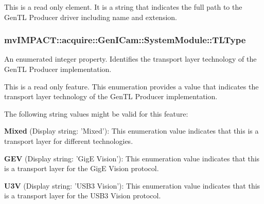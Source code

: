 This is a read only element. It is a string that indicates the full path to the Gen\+T\+L Producer driver including name and extension. \hypertarget{classmv_i_m_p_a_c_t_1_1acquire_1_1_gen_i_cam_1_1_system_module_a483183eb91826654275c0861dce3e1cd}{
\subsubsection[{T\+L\+Type}]{ mv\+I\+M\+P\+A\+C\+T\+::acquire\+::\+Gen\+I\+Cam\+::\+System\+Module\+::\+T\+L\+Type}}\label{classmv_i_m_p_a_c_t_1_1acquire_1_1_gen_i_cam_1_1_system_module_a483183eb91826654275c0861dce3e1cd}


An enumerated integer property. Identifies the transport layer technology of the Gen\+T\+L Producer implementation. 

This is a read only feature. This enumeration provides a value that indicates the transport layer technology of the Gen\+T\+L Producer implementation.

The following string values might be valid for this feature\+:
\begin{DoxyItemize}
\item {\bfseries Mixed} (Display string\+: 'Mixed')\+: This enumeration value indicates that this is a transport layer for different technologies.
\item {\bfseries G\+E\+V} (Display string\+: 'Gig\+E Vision')\+: This enumeration value indicates that this is a transport layer for the Gig\+E Vision protocol.
\item {\bfseries U3\+V} (Display string\+: 'U\+S\+B3 Vision')\+: This enumeration value indicates that this is a transport layer for the U\+S\+B3 Vision protocol.
\end{DoxyItemize}


